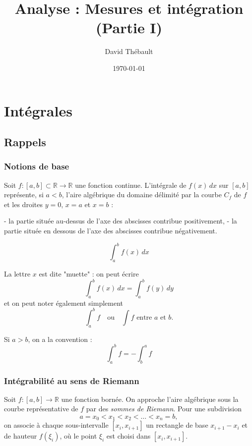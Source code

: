 \documentclass{report} %
\title{Analyse : Mesures et intégration (Partie I)}
\author{David Thébault}
\date{\today}
\theoremstyle{definition}  %
\theoremstyle{plain} %
\theoremstyle{remark} %
\begin{document}
\maketitle

\chapter{\textbf{Intégrales}}

\section{\textbf{Rappels}}

\subsection{Notions de base}

Soit \(f : [a,b] \subset \mathbb{R} \to \mathbb{R}\) une fonction continue.  
L'intégrale de \(f(x)\,dx\) sur \([a,b]\) représente, si \(a < b\), l'aire algébrique du domaine délimité par la courbe \(C_f\) de \(f\) et les droites \(y=0\), \(x=a\) et \(x=b\) :  

- la partie située au-dessus de l'axe des abscisses contribue positivement,  
- la partie située en dessous de l'axe des abscisses contribue négativement.  

\[
\int_a^b f(x)\,dx
\]

\noindent
La lettre \(x\) est dite "muette" : on peut écrire  
\[
\int_a^b f(x)\,dx = \int_a^b f(y)\,dy
\]  
et on peut noter également simplement  
\[
\int_a^b f \quad \text{ou} \quad \int f \text{ entre } a \text{ et } b.
\]

\medskip
\noindent
Si \(a > b\), on a la convention :  
\[
\int_a^b f = - \int_b^a f
\]

\medskip

\subsection{Intégrabilité au sens de Riemann}

Soit \(f : [a,b] \to \mathbb{R}\) une fonction bornée.
On approche l’aire algébrique sous la courbe représentative de \(f\)
par des \emph{sommes de Riemann}.
Pour une subdivision
\[
a = x_0 < x_1 < x_2 < \dots < x_n = b,
\]
on associe à chaque sous-intervalle \([x_i,x_{i+1}]\) un rectangle
de base \(x_{i+1}-x_i\) et de hauteur \(f(\xi_i)\), où le point
\(\xi_i\) est choisi dans \([x_i,x_{i+1}]\).
\end{document}
